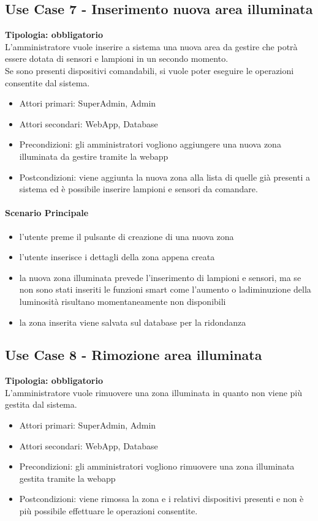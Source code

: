 \documentclass[12pt]{article}
\begin{document}
\subsection{Use Case 7 - Inserimento nuova area illuminata}
\textbf{Tipologia: obbligatorio} \\
L'amministratore vuole inserire a sistema una nuova area da gestire che potrà essere dotata di sensori e lampioni in un secondo momento.\\
Se sono presenti dispositivi comandabili, si vuole poter eseguire le operazioni consentite dal sistema.
\begin{itemize}
	\item Attori primari: SuperAdmin, Admin
	\item Attori secondari: WebApp, Database
	\item Precondizioni: gli amministratori vogliono aggiungere una nuova zona illuminata da gestire tramite la webapp
	\item Postcondizioni: viene aggiunta la nuova zona alla lista di quelle già presenti a sistema ed è possibile inserire lampioni e sensori da comandare.
\end{itemize}
\paragraph{Scenario Principale}
\begin{itemize}
	\item l'utente preme il pulsante di creazione di una nuova zona
	\item l'utente inserisce i dettagli della zona appena creata
	\item la nuova zona illuminata prevede l'inserimento di lampioni e sensori, ma se non sono stati inseriti le funzioni smart come l'aumento o ladiminuzione della luminosità risultano momentaneamente non disponibili
	\item la zona inserita viene salvata sul database per la ridondanza
\end{itemize}

\subsection{Use Case 8 - Rimozione area illuminata}
\textbf{Tipologia: obbligatorio} \\
L'amministratore vuole rimuovere una zona illuminata in quanto non viene più gestita dal sistema.
\begin{itemize}
	\item Attori primari: SuperAdmin, Admin
	\item Attori secondari: WebApp, Database
	\item Precondizioni: gli amministratori vogliono rimuovere una zona illuminata gestita tramite la webapp
	\item Postcondizioni: viene rimossa la zona e i relativi dispositivi presenti e non è più possibile effettuare le operazioni consentite.
\end{itemize}
\end{document}
